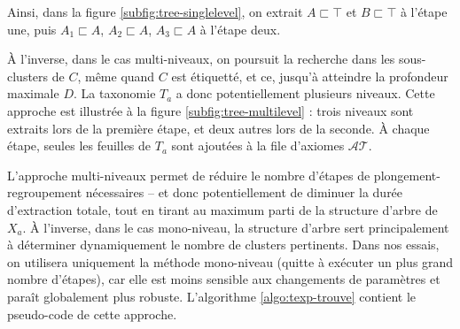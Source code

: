 Ainsi, dans la figure \ref{subfig:tree-singlelevel}, on extrait $A \sqsubset \top$ et $B \sqsubset \top$ à l'étape une, puis $A_1 \sqsubset A$, $A_2 \sqsubset A$, $A_3 \sqsubset A$ à l'étape deux.

À l'inverse, dans le cas multi-niveaux, on poursuit la recherche dans les sous-clusters de $C$, même quand $C$ est étiquetté, et ce, jusqu'à atteindre la profondeur maximale $D$. La taxonomie $T_a$ a donc potentiellement plusieurs niveaux. Cette approche est illustrée à la figure \ref{subfig:tree-multilevel} : trois niveaux sont extraits lors de la première étape, et deux autres lors de la seconde. À chaque étape, seules les feuilles de $T_a$ sont ajoutées à la file d'axiomes $\mathcal{AT}$.




L'approche multi-niveaux permet de réduire le nombre d'étapes de plongement-regroupement nécessaires – et donc potentiellement de diminuer la durée d'extraction totale, tout en tirant au maximum parti de la structure d'arbre de $X_a$. À l'inverse, dans le cas mono-niveau, la structure d'arbre sert principalement à déterminer dynamiquement le nombre de clusters pertinents. Dans nos essais, on utilisera uniquement la méthode mono-niveau (quitte à exécuter un plus grand nombre d'étapes), car elle est moins sensible aux changements de paramètres et paraît globalement plus robuste. L'algorithme \ref{algo:texp-trouve} contient le pseudo-code de cette approche.

